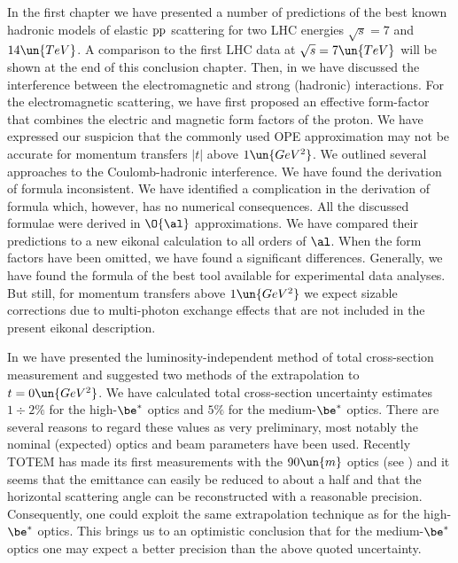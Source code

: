 \def\CaptionPrefix{C.}

In the first chapter we have presented a number of predictions of the best known hadronic models of elastic $\rm pp$ scattering for two LHC energies $\sqrt s = 7$ and $14\un{TeV}$. A comparison to the first LHC data at $\sqrt s = 7\un{TeV}$ will be shown at the end of this conclusion chapter. Then, in  we have discussed the interference between the electromagnetic and strong (hadronic) interactions. For the electromagnetic scattering, we have first proposed an effective form-factor that combines the electric and magnetic form factors of the proton. We have expressed our suspicion that the commonly used OPE approximation may not be accurate for momentum transfers $|t|$ above $1\un{GeV^2}$. We outlined several approaches to the Coulomb-hadronic interference. We have found the derivation of \WaY{} formula inconsistent. We have identified a complication in the derivation of \KaL{} formula which, however, has no numerical consequences. All the discussed formulae were derived in $\O{\al}$ approximations. We have compared their predictions to a new eikonal calculation to all orders of $\al$. When the form factors have been omitted, we have found a significant differences. Generally, we have found the formula of \KaL{} the best tool available for experimental data analyses. But still, for momentum transfers above $1\un{GeV^2}$ we expect sizable corrections due to multi-photon exchange effects that are not included in the present eikonal description.

In  we have presented the luminosity-independent method of total cross-section measurement and suggested two methods of the extrapolation to $t=0\un{GeV^2}$. We have calculated total cross-section uncertainty estimates $1\div2\percent$ for the high-$\be^*$ optics and $5\percent$ for the medium-$\be^*$ optics. There are several reasons to regard these values as very preliminary, most notably the nominal (expected) optics and beam parameters have been used. Recently TOTEM has made its first measurements with the $90\un{m}$ optics (see ) and it seems that the emittance can easily be reduced to about a half and that the horizontal scattering angle can be reconstructed with a reasonable precision. Consequently, one could exploit the same extrapolation technique as for the high-$\be^*$ optics. This brings us to an optimistic conclusion that for the medium-$\be^*$ optics one may expect a better precision than the above quoted uncertainty.

